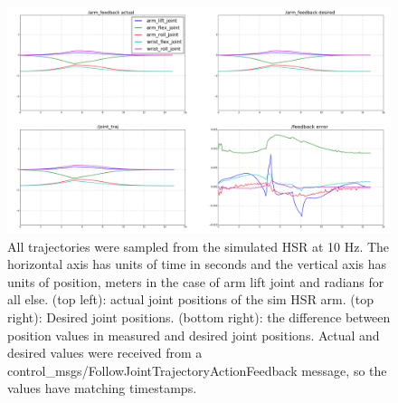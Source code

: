 \documentclass[11pt]{article}
\begin{document}
        \begin{figure}
            \includegraphics[width=\linewidth]{2020.04.02/positions_fixed.png}
            \centering
            \caption{All trajectories were sampled from the simulated HSR at 10 Hz. The horizontal axis has units of time in seconds and the vertical axis has units of position, meters in the case of arm lift joint and radians for all else. (top left): actual joint positions of the sim HSR arm. (top right): Desired joint positions. (bottom right): the difference between position values in measured and desired joint positions. Actual and desired values were received from a control\_msgs/FollowJointTrajectoryActionFeedback message, so the values have matching timestamps.}
            \label{fig:posAccuracy}
        \end{figure}
\end{document}
